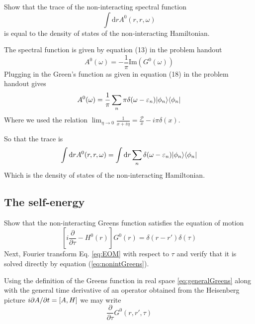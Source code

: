 \begin{exercise}
Show that the trace of the non-interacting spectral function
\begin{equation}
\int \mathrm{d}r A^{0}(r,r,\omega)
\end{equation}
is equal to the density of states of the non-interacting Hamiltonian.
\end{exercise}
\begin{solution}
The spectral function is given by equation (13) in the problem handout
\begin{equation}
    A^0(\omega) = - \frac{1}{\pi} \mathrm{Im}(G^0(\omega))
\end{equation}
Plugging in the Green's function as given in equation (18) in the problem handout gives 
\begin{equation}
    A^0(\omega) = \frac{1}{\pi} \sum_n  \pi \delta(\omega- \varepsilon_n) |\phi_n\rangle \langle \phi_n |
\end{equation}
Where we used the relation $\lim_{\eta \rightarrow 0} \frac{1}{x + i \eta} = \frac{\mathcal{P}}{x} - i \pi \delta(x)$.
\end{solution}
So that the trace is
\begin{equation}
    \int \mathrm{d}r A^0(r,r,\omega) = \int \mathrm{d}r \sum_n \delta(\omega-\varepsilon_n) |\phi_n\rangle \langle \phi_n |
\end{equation}
Which is the density of states of the non-interacting Hamiltonian.
\subsection{The self-energy}
\begin{exercise}
Show that the non-interacting Greens function satisfies the equation of motion
\begin{equation}\label{eq:EOM}
    \left[i\dfrac{\partial}{\partial \tau} - H^{0}(r)\right]G^{0}(r) = \delta(r-r')\delta(\tau)
\end{equation}
Next, Fourier transform Eq. \ref{eq:EOM} with respect to $\tau$ and verify that it is solved directly by equation (\ref{eq:nonintGreens}).
\end{exercise}
\begin{solution}
Using the definition of the Greens function in real space \eqref{eq:generalGreens} along with the general time derivative of an operator obtained from the Heisenberg picture $i\partial A/\partial t = \comm{A}{H}$ we may write
\begin{equation}
    \dfrac{\partial}{\partial \tau} G^{0}(r,r',\tau)
\end{equation}
\end{solution}


